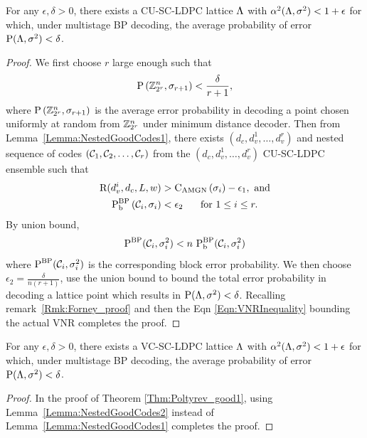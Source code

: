 \begin{theorem}\label{Thm:Poltyrev_good1}
   For any $\epsilon,\delta>0$, there exists a CU-SC-LDPC lattice $\Lambda$ with $\alpha^2(\Lambda,\sigma^2)<1+\epsilon$ for which, under multistage BP decoding, the average probability of error $\text{P}(\Lambda,\sigma^{2})<\delta$.
\end{theorem}
\begin{proof}
We first choose $r$ large enough such that 
\begin{equation}
\text{P}\left(\mathbb{Z}_{2^{r}}^{n},\sigma_{r+1}\right)<\frac{\delta}{r+1},\notag
\end{equation}
where $\text{P}\left(\mathbb{Z}_{2^{r}}^{n},\sigma_{r+1}\right)$ is the average error probability in decoding a point chosen uniformly at random from $\mathbb{Z}_{2^{r}}^{n}$ under minimum distance decoder. 
Then from Lemma~\ref{Lemma:NestedGoodCodes1}, there exists $(d_{c},d_{v}^{1},\ldots,d_{v}^{r})$ and nested sequence of codes $(\mathcal{C}_{1}, \mathcal{C}_{2}, \ldots,\mathcal{C}_{r})$ from the $(d_{c},d_{v}^{1},\ldots,d_{v}^{r})$ CU-SC-LDPC ensemble such that 
\begin{align}
\text{R}(d_{v}^{i},d_{c},L,w)&>\text{C}_{\text{AMGN}}\left(\sigma_{i}\right)-\epsilon_{1}, \text{ and} \\
\text{P}_{\text{b}}^{\text{BP}}\left(\mathcal{C}_{i},\sigma_{i}\right)&<\epsilon_{2} \hspace{0.5cm}\text{ for }1\leq i \leq r.
\end{align}	
By union bound,  %
\begin{equation}\label{Eqn:Ineq-UncodedLevel}
\text{P}^{\text{BP}}(\mathcal{C}_{i},\sigma^{2}_{i})< n~\text{P}_{\text{b}}^{\text{BP}}(\mathcal{C}_{i},\sigma^{2}_{i})
\end{equation}
 where $\text{P}^{\text{BP}}(\mathcal{C}_{i},\sigma^{2}_{i})$ is the corresponding block error probability. We then choose $\epsilon_{2}=\frac{\delta}{n(r+1)}$, use the union bound to bound the total error probability in decoding a lattice point which results in $\text{P}(\Lambda,\sigma^{2})<\delta$. Recalling remark~\ref{Rmk:Forney_proof} and then the Eqn \eqref{Eqn:VNRInequality} bounding the actual VNR completes the proof.
\end{proof}

\begin{theorem}\label{Thm:Poltyrev_good2}
   For any $\epsilon,\delta>0$, there exists a VC-SC-LDPC lattice $\Lambda$ with $\alpha^2(\Lambda,\sigma^2)<1+\epsilon$ for which, under multistage BP decoding, the average probability of error $\text{P}(\Lambda,\sigma^{2})<\delta$.
\end{theorem}
\begin{proof}
In the proof of Theorem \ref{Thm:Poltyrev_good1}, using Lemma~\ref{Lemma:NestedGoodCodes2} instead of Lemma~\ref{Lemma:NestedGoodCodes1} completes the proof. \end{proof}

